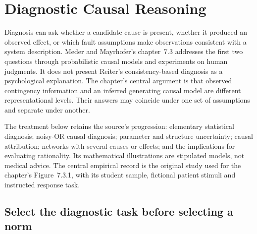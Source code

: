 \chapter{Diagnostic Causal Reasoning}
\label{sec:p19-rationality-7-3}

Diagnosis can ask whether a candidate cause is present, whether it produced
an observed effect, or which fault assumptions make observations consistent
with a system description. Meder and Mayrhofer's chapter~7.3 addresses the
first two questions through probabilistic causal models and experiments
on human judgments. It does not present Reiter's consistency-based diagnosis
as a psychological explanation. The chapter's central argument is that
observed contingency information and an inferred generating causal model
are different representational levels. Their answers may coincide under
one set of assumptions and separate under another.
\cite[chapter~7.3, pp.~449--455]{MederMayrhofer2021DiagnosticCausal}

The treatment below retains the source's progression: elementary statistical
diagnosis; noisy-OR causal diagnosis; parameter and structure uncertainty;
causal attribution; networks with several causes or effects; and the
implications for evaluating rationality. Its mathematical illustrations
are stipulated models, not medical advice. The central empirical record is
the original study used for the chapter's Figure~7.3.1, with its student
sample, fictional patient stimuli and instructed response task.

\section{Select the diagnostic task before selecting a norm}
\label{sec:p19-rat73-task}

